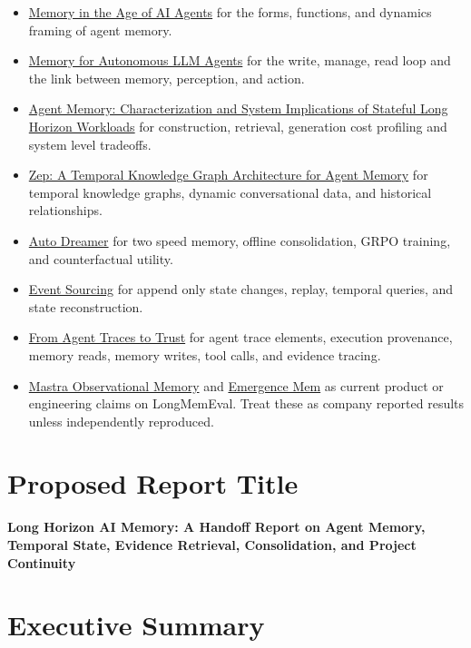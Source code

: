 \documentclass[11pt]{article}
\begin{document}
\begin{itemize}
  \item \href{https://arxiv.org/abs/2512.13564}{Memory in the Age of AI Agents} for the forms, functions, and dynamics framing of agent memory.
  \item \href{https://arxiv.org/abs/2603.07670}{Memory for Autonomous LLM Agents} for the write, manage, read loop and the link between memory, perception, and action.
  \item \href{https://arxiv.org/abs/2606.06448}{Agent Memory: Characterization and System Implications of Stateful Long Horizon Workloads} for construction, retrieval, generation cost profiling and system level tradeoffs.
  \item \href{https://arxiv.org/abs/2501.13956}{Zep: A Temporal Knowledge Graph Architecture for Agent Memory} for temporal knowledge graphs, dynamic conversational data, and historical relationships.
  \item \href{https://arxiv.org/abs/2605.20616}{Auto Dreamer} for two speed memory, offline consolidation, GRPO training, and counterfactual utility.
  \item \href{https://martinfowler.com/eaaDev/EventSourcing.html}{Event Sourcing} for append only state changes, replay, temporal queries, and state reconstruction.
  \item \href{https://arxiv.org/abs/2606.04990}{From Agent Traces to Trust} for agent trace elements, execution provenance, memory reads, memory writes, tool calls, and evidence tracing.
  \item \href{https://mastra.ai/research/observational-memory}{Mastra Observational Memory} and \href{https://www.emergence.ai/blog/sota-on-longmemeval-with-rag}{Emergence Mem} as current product or engineering claims on LongMemEval. Treat these as company reported results unless independently reproduced.
\end{itemize}

\section*{Proposed Report Title}

\textbf{Long Horizon AI Memory: A Handoff Report on Agent Memory, Temporal State, Evidence Retrieval, Consolidation, and Project Continuity}

\tableofcontents

\newpage

\section{Executive Summary}
\end{document}
